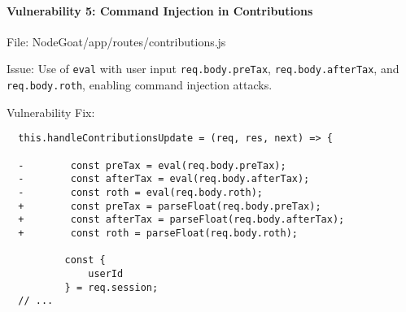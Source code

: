   \hypertarget{vulnerability-5-command-injection-in-contributions}{%
  \paragraph{Vulnerability 5: Command Injection in
  Contributions}\label{vulnerability-5-command-injection-in-contributions}}
  
  File: NodeGoat/app/routes/contributions.js
  
  Issue: Use of \texttt{eval} with user input \texttt{req.body.preTax},
  \texttt{req.body.afterTax}, and \texttt{req.body.roth}, enabling command
  injection attacks.
  
  Vulnerability Fix:
  
  \begin{framed}\scriptsize
\begin{verbatim}
  this.handleContributionsUpdate = (req, res, next) => {
  
  -        const preTax = eval(req.body.preTax);
  -        const afterTax = eval(req.body.afterTax);
  -        const roth = eval(req.body.roth);
  +        const preTax = parseFloat(req.body.preTax);
  +        const afterTax = parseFloat(req.body.afterTax);
  +        const roth = parseFloat(req.body.roth);
  
          const {
              userId
          } = req.session;
  // ...
  \end{verbatim}
      
  \end{framed}\normalsize